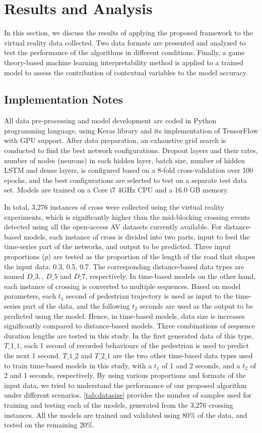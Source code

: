 \section{Results and Analysis}
\label{S:t5}
In this section, we discuss the results of applying the proposed framework to the virtual reality data collected. Two data formats are presented and analyzed to test the performance of the algorithms in different conditions. Finally, a game theory-based machine learning interpretability method is applied to a trained model to assess the contribution of contextual variables to the model accuracy.  
\subsection{Implementation Notes}
All data pre-processing and model development are coded in Python programming language, using Keras library and its implementation of TensorFlow with GPU support. After data preparation, an exhaustive grid search is conducted to find the best network configurations. Dropout layers and their rates, number of nodes (neurons) in each hidden layer, batch size, number of hidden LSTM and dense layers, is configured based on a 8-fold cross-validation over 100 epochs, and the best configurations are selected to test on a separate test data set. Models are trained on a Core i7 4GHz CPU and a 16.0 GB memory. 

In total, 3,276 instances of cross were collected using the virtual reality experiments, which is significantly higher than the mid-blocking crossing events detected using all the open-access AV datasets currently available. For distance-based models, each instance of cross is divided into two parts, input to feed the time-series part of the networks, and output to be predicted. Three input proportions ($p$) are tested as the proportion of the length of the road that shapes the input data: 0.3, 0.5, 0.7. The corresponding distance-based data types are named $D\_3,$, $D\_5$ and $D\_7$, respectively. In time-based models on the other hand, each instance of crossing is converted to multiple sequences. Based on model parameters, each $t_1$ second of pedestrian trajectory is used as input to the time-series part of the data, and the following $t_2$ seconds are used as the output to be predicted using the model. Hence, in time-based models, data size is increases significantly compared to distance-based models. Three combinations of sequence duration lengths are tested in this study. In the first generated data of this type, $T\_1\_1$, each 1 second of recorded behaviours of the pedestrian is used to predict the next 1 second. $T\_1\_2$ and $T\_2\_1$ are the two other time-based data types used to train time-based models in this study, with a $t_1$ of 1 and 2 seconds, and a $t_2$ of 2 and 1 seconds, respectively. By using various proportions and formats of the input data, we tried to understand the performance of our proposed algorithm under different scenarios. \cref{tab:datasize} provides the number of samples used for training and testing each of the models, generated from the 3,276 crossing instances. All the models are trained and validated using 80\% of the data, and tested on the remaining 20\%.

